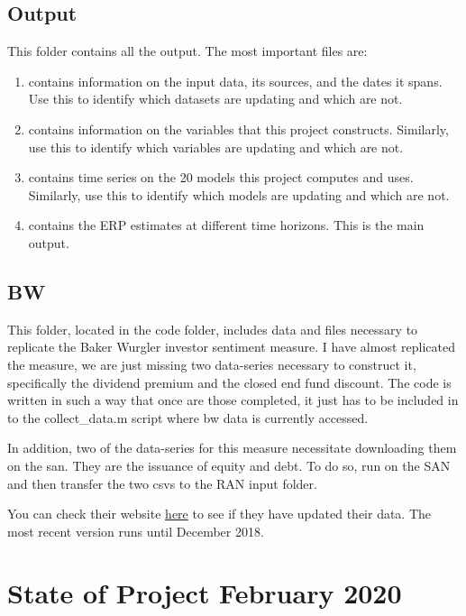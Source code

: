 \documentclass{article}
\begin{document}
	\subsection{Output}
	
	This folder contains all the output. The most important files are: 
	
	\begin{enumerate}
		\item {} contains information on the input data, its sources, and the dates it spans. Use this to identify which datasets are updating and which are not. 
		\item {} contains information on the variables that this project constructs. Similarly, use this to identify which variables are updating and which are not. 
		\item {} contains time series on the 20 models this project computes and uses. Similarly, use this to identify which models are updating and which are not. 
		\item {} contains the ERP estimates at different time horizons. This is the main output. 
	\end{enumerate}
	
	\subsection{BW}
	
	This folder, located in the code folder, includes data and files necessary to replicate the Baker Wurgler investor sentiment measure. I have almost replicated the measure, we are just missing two data-series necessary to construct it, specifically the dividend premium and the closed end fund discount. The code is written in such a way that once are those completed, it just has to be included in to the collect\_data.m script where bw data is currently accessed. 
	
	In addition, two of the data-series for this measure necessitate downloading them on the san. They are the issuance of equity and debt. To do so, run  on the SAN and then transfer the two csvs to the RAN input folder.
	
	You can check their website \href{http://people.stern.nyu.edu/jwurgler/}{here} to see if they have updated their data. The most recent version runs until December 2018. 
	
	\section{State of Project February 2020}
	
\end{document}
